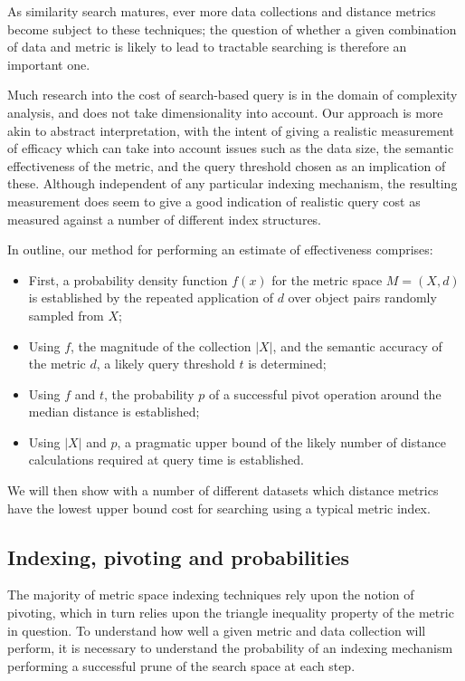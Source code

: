 As similarity search matures, ever more data collections and distance metrics become subject to these techniques; the question of whether a given combination of data and metric is likely to lead to tractable searching is therefore an important one.

Much research into the cost of search-based query is in the domain of complexity analysis, and does not take dimensionality into account. Our approach is more akin to abstract interpretation, with the intent of giving a realistic measurement of efficacy which can take into account issues such as the data size, the semantic effectiveness of the metric, and the query threshold chosen as an implication of these. Although independent of any particular indexing mechanism, the resulting measurement does seem to give a good indication of realistic query cost as measured against a number of different index structures.

In outline, our method for performing an estimate of effectiveness comprises:
\begin{itemize}
\item First, a probability density function $f(x)$ for the metric space $M = (X, d)$  is established by the repeated application of $d$ over object pairs randomly sampled from $X$;
\item Using $f$, the magnitude of the collection $|X|$, and the semantic accuracy of the metric $d$, a likely query threshold $t$ is determined;
\item Using $f$ and $t$, the probability $p$ of a successful pivot operation around the median distance is established;
\item Using $|X|$ and $p$, a pragmatic upper bound of the likely number of distance calculations required at query time is established.
\end{itemize}
We will then show with a number of different datasets which distance metrics have the lowest upper bound cost for searching using a typical metric index.
\subsection{Indexing, pivoting and probabilities}
The majority of metric space indexing techniques rely upon the notion of pivoting, which in turn relies upon the triangle inequality property of the metric in question. To understand how well a given metric and data collection will perform, it is necessary to understand the probability of an indexing mechanism performing a successful prune of the search space at each step.

